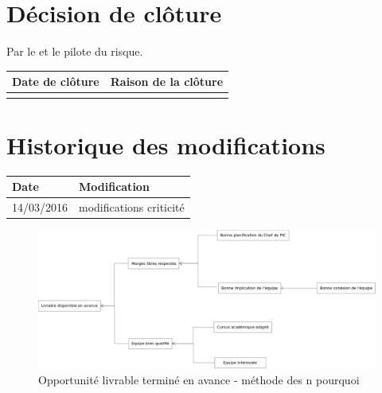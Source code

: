 \section*{Décision de clôture}
Par le \CP{} et le pilote du risque.
\begin{table}[h]
\centering
	\begin{tabularx}{16.8cm}{|X|X|}
	\hline
	\rowcolor{gray!40} Date de clôture & Raison de la clôture \\
	\hline
	  & \\
	\hline
	\end{tabularx}
\end{table}

\section*{Historique des modifications}
\begin{table}[h]
\centering
	\begin{tabularx}{16.8cm}{|X|X|}
	\hline
	\rowcolor{gray!40} Date & Modification \\
	\hline
	 14/03/2016 & modifications criticité \\
	\hline
	\end{tabularx}
\end{table}
\newpage

\begin{figure}[!h]
	\centering
	\includegraphics[scale=0.27]{images/AnalyseOpportunite_nPourquoi_FDO002}
	\caption{\label{opportunite livrable termine en avance} Opportunité livrable terminé en avance - méthode des n pourquoi}
\end{figure}
